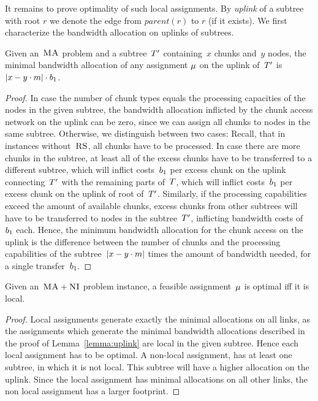 It remains to prove optimality of such local assignments.
By \emph{uplink} of a subtree with root $r$ we denote the edge from $parent(r)$ to $r$ (if it exists).
We first characterize the bandwidth allocation on uplinks of subtrees.
\begin{lemma}\label{lem:uplink-alloc}
Given an~$\textsc{MA}$ problem and a subtree~$T'$
containing~$x$
chunks and~$y$ nodes, the minimal bandwidth allocation of any
assignment
$\mu$ on the uplink of~$T'$ is~$|x-y\cdot m|\cdot
b_1$.
\label{lemma:uplink}
\end{lemma}
\begin{proof}
In case the number of chunk types equals the processing capacities of the
nodes in the given subtree,
the bandwidth allocation inflicted by the chunk access network on the uplink can
be
zero, since we can assign all chunks to nodes in the same subtree.
Otherwise, we distinguish between two cases: Recall, that in instances
without~$\textsc{RS}$, all chunks have to be processed. In case
there are more chunks in the subtree, at least all of the excess chunks have to
be transferred to a different subtree, which will
inflict costs~$b_1$ per excess chunk on the uplink connecting~$T'$
with the
remaining parts of~$T$, which will inflict costs~$b_1$ per excess chunk on the uplink of root of~$T'$.
 Similarly, if the processing capabilities exceed the
amount of
available chunks, excess chunks from other subtrees will have to be transferred
to
nodes in the subtree~$T'$, inflicting bandwidth costs of~$b_1$ each.
Hence, the minimum bandwidth allocation for the chunk access on the uplink
is the difference between the number of chunks and the processing capabilities
of the subtree~$|x-y\cdot m|$ times the amount of bandwidth needed,
for a single transfer~$b_1$.
\end{proof}


\begin{theorem}
Given an~$\textsc{MA}+\textsc{NI}$ problem instance, a feasible assignment~$\mu$
is optimal iff it is local.
\label{thm:local_optimal}
\end{theorem}

\begin{proof}
Local assignments generate exactly the minimal allocations on all links, as
 the assignments which generate the minimal bandwidth allocations
described in
the proof of
Lemma~\ref{lemma:uplink} are local in the given subtree. Hence
each local assignment has to be optimal. A non-local assignment, has at least
one subtree, in which it is not local. This subtree will have a higher
allocation on the uplink. Since the local assignment has minimal allocations
on all other links, the non local assignment has a larger footprint.
\end{proof}



